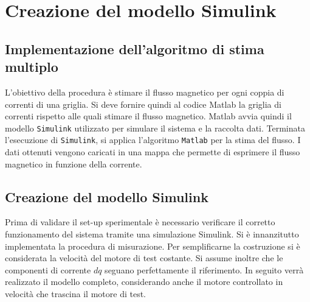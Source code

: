 \chapter{Creazione del modello Simulink}
\raggedbottom


\section{Implementazione dell'algoritmo di stima multiplo}
L'obiettivo della procedura è stimare il flusso magnetico per ogni coppia di correnti di una griglia.
Si deve fornire quindi al codice Matlab la griglia di correnti rispetto alle quali stimare il flusso magnetico.
Matlab avvia quindi il modello \texttt{Simulink} utilizzato per simulare il sistema e la raccolta dati.
Terminata l'esecuzione di \texttt{Simulink}, si applica l'algoritmo \texttt{Matlab} per la stima del flusso. I dati ottenuti vengono caricati in una mappa che permette di esprimere il flusso magnetico in funzione della corrente.

\section{Creazione del modello Simulink}
Prima di validare il set-up sperimentale è necessario verificare il corretto funzionamento del sistema tramite una simulazione Simulink.
Si è innanzitutto implementata la procedura di misurazione. Per semplificarne la costruzione si è considerata la velocità del motore di test costante.
Si assume inoltre che le componenti di corrente $dq$ seguano perfettamente il riferimento.
In seguito verrà realizzato il modello completo, considerando anche il motore controllato in velocità che trascina il motore di test.



